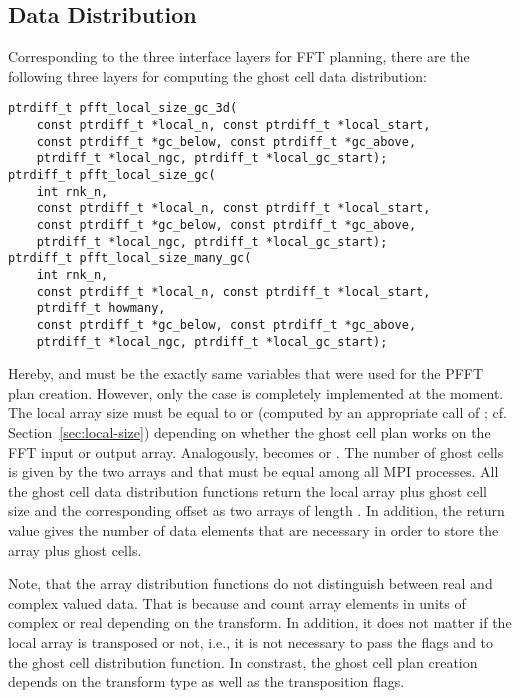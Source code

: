 \subsection{Data Distribution}\label{sec:gc:local-size}
Corresponding to the three interface layers for FFT planning, there are the following three layers
for computing the ghost cell data distribution:
\begin{lstlisting}
ptrdiff_t pfft_local_size_gc_3d(
    const ptrdiff_t *local_n, const ptrdiff_t *local_start,
    const ptrdiff_t *gc_below, const ptrdiff_t *gc_above,
    ptrdiff_t *local_ngc, ptrdiff_t *local_gc_start);
ptrdiff_t pfft_local_size_gc(
    int rnk_n, 
    const ptrdiff_t *local_n, const ptrdiff_t *local_start,
    const ptrdiff_t *gc_below, const ptrdiff_t *gc_above,
    ptrdiff_t *local_ngc, ptrdiff_t *local_gc_start);
ptrdiff_t pfft_local_size_many_gc(
    int rnk_n,
    const ptrdiff_t *local_n, const ptrdiff_t *local_start,
    ptrdiff_t howmany,
    const ptrdiff_t *gc_below, const ptrdiff_t *gc_above,
    ptrdiff_t *local_ngc, ptrdiff_t *local_gc_start);
\end{lstlisting}
Hereby,  and  must be the exactly same variables that were used for the PFFT plan creation.
However, only the case  is completely implemented at the moment. 
The local array size  must be equal to  or  (computed by an appropriate
call of ; cf. Section~\ref{sec:local-size}) depending on whether the ghost cell plan works on the FFT input or output array.
Analogously,  becomes  or .
The number of ghost cells is given by the two arrays  and  that must be equal among all MPI processes.
All the ghost cell data distribution functions return the local array plus ghost cell size 
and the corresponding offset  as two arrays of length . In addition,
the  return value gives the number of data elements that are necessary in order to store the array plus ghost cells.

Note, that the array distribution functions do not distinguish between real and complex valued data.
That is because  and  count array elements in units of complex or real depending on the transform.
In addition, it does not matter if the local array is transposed or not,
i.e., it is not necessary to pass the flags  and  to the ghost cell distribution function.
In constrast, the ghost cell plan creation depends on the transform type as well as the transposition flags.

